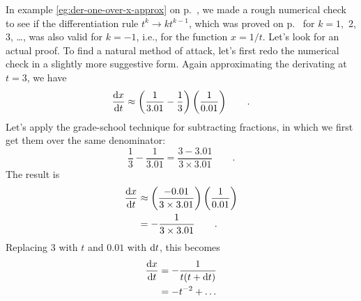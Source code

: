 \begin{eg}\label{eg:derivative-of-one-over-x}
In example \ref{eg:der-one-over-x-approx} on p.~\pageref{eg:der-one-over-x-approx}, we made a rough numerical
check to see if the differentiation rule $t^k \rightarrow kt^{k-1}$, which was proved on p.~\pageref{detour:polynomial-proof}
for $k=1,$ 2, 3, \ldots, was also valid for $k=-1$, i.e., for the function $x=1/t$. Let's look for an actual proof. To find a natural method of attack,
let's first redo the numerical check in a slightly more suggestive form. Again approximating the derivating at
$t=3$, we have
\begin{equation*}
  \frac{\textup{d} x}{\textup{d} t}  \approx \left(\frac{1}{3.01}-\frac{1}{3}\right)\left(\frac{1}{0.01}\right)  \qquad .
\end{equation*}
Let's apply the grade-school technique for subtracting fractions, in which we first get them over the same denominator:
\begin{equation*}
  \frac{1}{3}-\frac{1}{3.01} = \frac{3-3.01}{3\times3.01}  \qquad .
\end{equation*}
The result is 
\begin{align*}
  \frac{\textup{d} x}{\textup{d} t}  &\approx \left(\frac{-0.01}{3\times3.01}\right)\left(\frac{1}{0.01}\right) \\
                         &=-\frac{1}{3\times3.01} \qquad .
\end{align*}
Replacing 3 with $t$ and $0.01$ with $\textup{d} t$, this becomes
\begin{align*}
  \frac{\textup{d} x}{\textup{d} t}  &= -\frac{1}{t (t+\textup{d} t)} \\
                         &= -t^{-2}+\ldots
\end{align*}
\end{eg}


